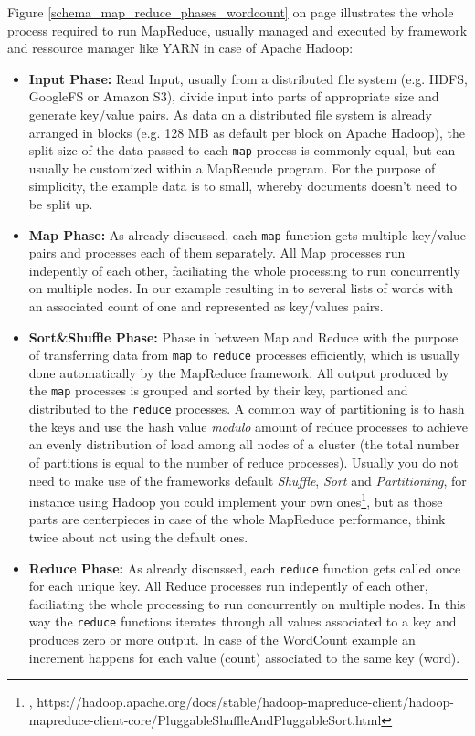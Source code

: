 {Figure \ref{schema_map_reduce_phases_wordcount} on page \pageref{schema_map_reduce_phases_wordcount} illustrates the whole process required to run MapReduce, usually managed and executed by framework and ressource manager like YARN in case of Apache Hadoop:\\
\begin{itemize}
\item \textbf{Input Phase:} Read Input, usually from a distributed file system (e.g. HDFS, GoogleFS or Amazon S3), divide input into parts of appropriate size and generate key/value pairs. As data on a distributed file system is already arranged in blocks (e.g. 128 MB as default per block on Apache Hadoop), the split size of the data passed to each \lstinline{map} process is commonly equal, but can usually be customized within a MapRecude program. For the purpose of simplicity, the example data is to small, whereby documents doesn't need to be split up. 
\item \textbf{Map Phase:} As already discussed, each \lstinline{map} function gets multiple key/value pairs and processes each of them separately. All Map processes run indepently of each other, faciliating the whole processing to run concurrently on multiple nodes. In our example resulting in to several lists of words with an associated count of one and represented as key/values pairs.
\item \textbf{Sort\&Shuffle Phase:} Phase in between Map and Reduce with the purpose of transferring data from \lstinline{map} to \lstinline{reduce} processes efficiently, which is usually done automatically by the MapReduce framework. All output produced by the \lstinline{map} processes is grouped and sorted by their key, partioned and distributed to the \lstinline{reduce} processes. A common way of partitioning is to hash the keys and use the hash value \textit{modulo} amount of reduce processes to achieve an evenly distribution of load among all nodes of a cluster (the total number of partitions is equal to the number of reduce processes). Usually you do not need to make use of the frameworks default \textit{Shuffle}, \textit{Sort} and \textit{Partitioning}, for instance using Hadoop you could implement your own ones\footnote{\cite{HDPSS}, https://hadoop.apache.org/docs/stable/hadoop-mapreduce-client/hadoop-mapreduce-client-core/PluggableShuffleAndPluggableSort.html}, but as those parts are centerpieces in case of the whole MapReduce performance, think twice about not using the default ones.
\item \textbf{Reduce Phase:} As already discussed, each \lstinline{reduce} function gets called once for each unique key. All Reduce processes run indepently of each other, faciliating the whole processing to run concurrently on multiple nodes. In this way the \lstinline{reduce} functions iterates through all values associated to a key and produces zero or more output. In case of the WordCount example an increment happens for each value (count) associated to the same key (word).

\end{itemize}}
